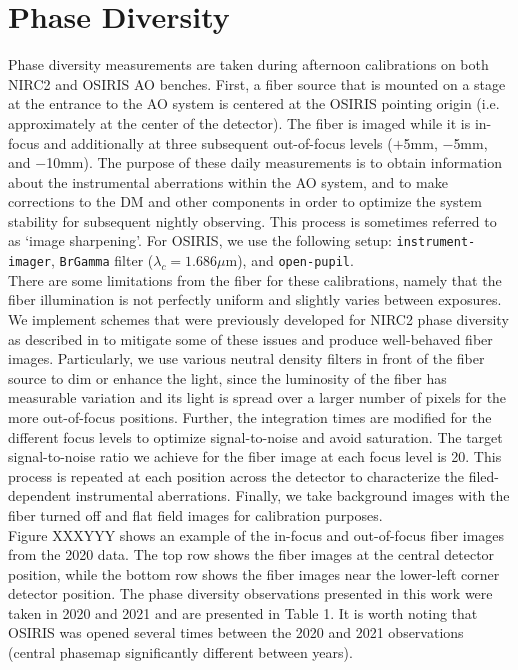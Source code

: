 \documentclass[]{spie}  %
\begin{document}
\section{Phase Diversity}\label{sec:phase-diversity}
Phase diversity measurements are taken during afternoon calibrations on both NIRC2 and OSIRIS AO benches. First, a fiber source that is mounted on a stage at the entrance to the AO system is centered at the OSIRIS pointing origin (i.e. approximately at the center of the detector). The fiber is imaged while it is in-focus and additionally at three subsequent out-of-focus levels ($+$5mm, $-$5mm, and $-$10mm). The purpose of these daily measurements is to obtain information about the instrumental aberrations within the AO system, and to make corrections to the DM and other components in order to optimize the system stability for subsequent nightly observing. This process is sometimes referred to as `image sharpening'. For OSIRIS, we use the following setup: \texttt{instrument-imager}, \texttt{BrGamma} filter ($\lambda_c = 1.686 \mu$m), and \texttt{open-pupil}.\\
\indent There are some limitations from the fiber for these calibrations, namely that the fiber illumination is not perfectly uniform and slightly varies between exposures. We implement schemes that were previously developed for NIRC2 phase diversity as described in \cite{Ciurlo:inprep} to mitigate some of these issues and produce well-behaved fiber images. Particularly, we use various neutral density filters in front of the fiber source to dim or enhance the light, since the luminosity of the fiber has measurable variation and its light is spread over a larger number of pixels for the more out-of-focus positions. Further, the integration times are modified for the different focus levels to optimize signal-to-noise and avoid saturation. The target signal-to-noise ratio we achieve for the fiber image at each focus level is 20. This process is repeated at each position across the detector to characterize the filed-dependent instrumental aberrations. Finally, we take background images with the fiber turned off and flat field images for calibration purposes. \\
\indent Figure XXXYYY shows an example of the in-focus and out-of-focus fiber images from the 2020 data. The top row shows the fiber images at the central detector position, while the bottom row shows the fiber images near the lower-left corner detector position. The phase diversity observations presented in this work were taken in 2020 and 2021 and are presented in Table 1. It is worth noting that OSIRIS was opened several times between the 2020 and 2021 observations (central phasemap significantly different between years).
\end{document}
